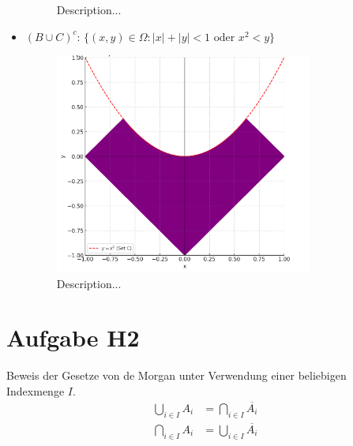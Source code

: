 \documentclass{article}
\begin{document}
\begin{itemize}
\begin{figure}[!ht]
        \caption{Description...}
    \end{figure}
    \item $(B \cup C)^c$: $\{(x, y) \in \Omega : |x| + |y| < 1 \text{ oder } x^2 < y\}$
    \begin{figure}[!ht]
        \centering
        \includegraphics[width=0.8\textwidth]{img/h1_c.png}
        \caption{Description...}
    \end{figure}
\end{itemize}

\section*{Aufgabe H2}
Beweis der Gesetze von de Morgan unter Verwendung einer beliebigen Indexmenge $I$.
\begin{align*}
    \bigcup_{i \in I} A_i &= \bigcap_{i \in I} \overline{A_i} \\
    \bigcap_{i \in I} A_i &= \bigcup_{i \in I} \overline{A_i}
\end{align*}
\end{document}
